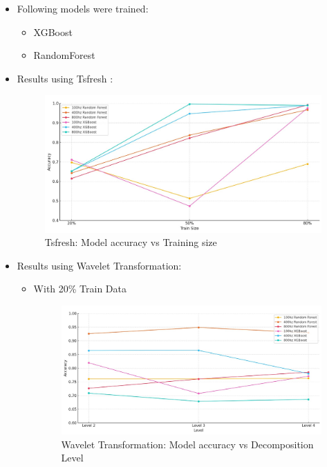 \documentclass{article}
\begin{document}
\begin{itemize}
    \item Following models were trained:
    \begin{itemize}
        \item XGBoost
        \item RandomForest
    \end{itemize}
    \item Results using Tsfresh :

        \begin{figure}[h]
            \centering
            \includegraphics[width=1\linewidth]{tsfresh-img.jpg}
            \caption{Tsfresh: Model accuracy vs Training size}
            \label{fig:enter-label}
        \end{figure}
    \clearpage
    \vspace*{-1cm}
    \item Results using Wavelet Transformation:
        \begin{itemize}
            \item With 20\% Train Data
                \begin{figure}[h]
                    \centering
                    \includegraphics[width=1\linewidth]{wavelet_20_percent.jpg}
                    \caption{Wavelet Transformation: Model accuracy vs Decomposition Level}

\end{figure}
\end{itemize}
\end{itemize}
\end{document}
